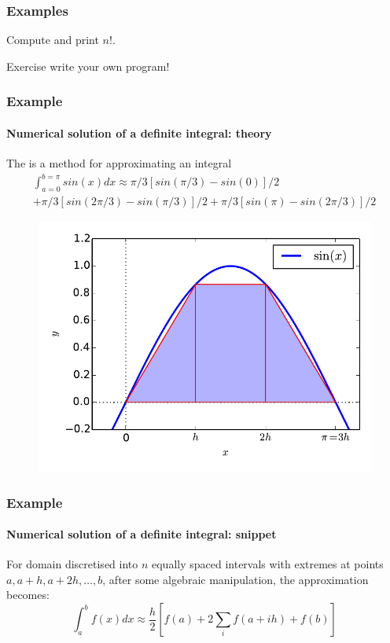 \documentclass[12pt]{beamer}
\begin{document}
\begin{frame}
  \frametitle{Examples}
  Compute and print  $n!$.
\LstFactorial
  \begin{alertblock}{Exercise}
    write your own program!
  \end{alertblock}
\end{frame}

\begin{frame}
  \frametitle{Example}
  \framesubtitle{Numerical solution of a definite integral: theory}
\small
  The  is a method for approximating an integral
  \begin{multline*}
        \int_{a=0}^{b=\pi} sin(x) dx \approx \pi/3 [sin(\pi/3) - sin(0)]/2 \\
            + \pi/3 [sin (2 \pi/3 ) - sin(\pi/3)]/2 + \pi/3 [sin(\pi) - sin(2\pi/3)]/2
  \end{multline*}
  \begin{figure}
    \includegraphics[height=0.7\textheight]{../figures/trapezium}
  \end{figure}
\end{frame}

\begin{frame}
  \frametitle{Example}
  \framesubtitle{Numerical solution of a definite integral: snippet}
\small
For domain discretised into $n$ equally spaced intervals with extremes at points $a,a+h,a+2h,\ldots,b$,
after some algebraic manipulation, the approximation becomes:
  \begin{equation*}
        \int_a^b f(x) dx \approx \frac{h}{2}[f(a)+2\sum_i f(a+ih)+f(b)]
  \end{equation*}
\LstTrapezium
\end{frame}
\end{document}
